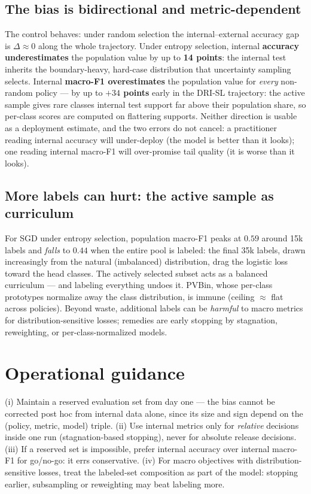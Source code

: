 \documentclass[11pt]{article}
\begin{document}
\subsection{The bias is bidirectional and metric-dependent}

The control behaves: under random selection the internal--external
accuracy gap is $\Delta \approx 0$ along the whole trajectory. Under
entropy selection, internal \textbf{accuracy underestimates} the
population value by up to \textbf{14 points}: the internal test inherits
the boundary-heavy, hard-case distribution that uncertainty sampling
selects. Internal \textbf{macro-F1 overestimates} the population value for
\emph{every} non-random policy --- by up to \textbf{$+34$ points} early in
the DRI-SL trajectory: the active sample gives rare classes internal test
support far above their population share, so per-class scores are computed
on flattering supports. Neither direction is usable as a deployment
estimate, and the two errors do not cancel: a practitioner reading
internal accuracy will under-deploy (the model is better than it looks);
one reading internal macro-F1 will over-promise tail quality (it is worse
than it looks).

\subsection{More labels can hurt: the active sample as curriculum}

For SGD under entropy selection, population macro-F1 peaks at
$0.59$ around 15k labels and \emph{falls} to $0.44$ when the entire pool
is labeled: the final 35k labels, drawn increasingly from the natural
(imbalanced) distribution, drag the logistic loss toward the head classes.
The actively selected subset acts as a balanced curriculum --- and
labeling everything undoes it. PVBin, whose per-class prototypes normalize
away the class distribution, is immune (ceiling $\approx$ flat across
policies). Beyond waste, additional labels can be \emph{harmful} to macro
metrics for distribution-sensitive losses; remedies are early stopping by
stagnation, reweighting, or per-class-normalized models.

\section{Operational guidance}
\label{sec:guidance}

(i) Maintain a reserved evaluation set from day one --- the bias cannot be
corrected post hoc from internal data alone, since its size and sign
depend on the (policy, metric, model) triple. (ii) Use internal metrics
only for \emph{relative} decisions inside one run (stagnation-based
stopping), never for absolute release decisions. (iii) If a reserved set
is impossible, prefer internal accuracy over internal macro-F1 for
go/no-go: it errs conservative. (iv) For macro objectives with
distribution-sensitive losses, treat the labeled-set composition as part
of the model: stopping earlier, subsampling or reweighting may beat
labeling more.
\end{document}
